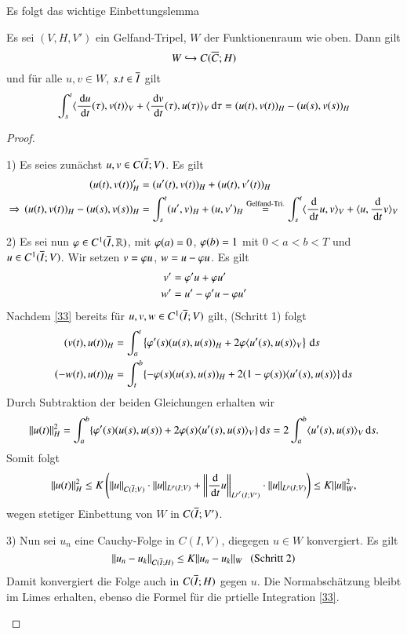 Es folgt das wichtige Einbettungslemma

\begin{lem}\label{4.38}
    Es sei $(V,H,V')$ ein Gelfand-Tripel, $W$ der Funktionenraum wie oben. Dann gilt
    \[
        W\hookrightarrow C(\overline C; H)
    \]
    und für alle $u,v\in W$, $s.t \in \overline I$ gilt
    \begin{align}\label{33}
        \int_s^t \langle  \frac{\, \mathrm{d} u}{\, \mathrm{d} t}(\tau), v(t)\rangle_V+ \langle \frac{\, \mathrm{d} v}{\, \mathrm{d} t} (\tau) , u(\tau)\rangle_V
        \, \mathrm{d}\tau =(u(t),v(t))_H - (u(s),v(s))_H
    \end{align}
\end{lem}

\begin{proof}
    \begin{description}
    \item{1)}
    Es seies zunächst $u,v \in C(\overline I; V)$. Es gilt
    \begin{align*}
        (u(t),v(t))_H'&=(u'(t),v(t))_H + (u(t),v'(t))_H\\
        \Rightarrow \, (u(t),v(t))_H-(u(s),v(s))_H &= \int_s^t (u',v)_H + (u,v')_H \overset{\text{Gelfand-Tri.}}
        {=} \int_s^t\langle \frac{\, \mathrm{d}}{\, \mathrm{d} t} u, v\rangle_V+\langle u,\frac{\, \mathrm{d}}{\, \mathrm{d} t} v \rangle _V
    \end{align*}
    \item{2)}
    Es sei nun $\varphi\in C^1(\overline I, \mathbb{R})$, mit $\varphi(a)=0$, $\varphi(b)=1$ mit $0<a<b<T$ und $u\in
    C^1(\overline I;V)$. Wir setzen $v=\varphi u$, $w=u-\varphi u$. Es gilt
    \begin{align*}
        v'&= \varphi'u + \varphi u' \\
        w'&=u'-\varphi'u-\varphi u'
    \end{align*}
    Nachdem \ref{33} bereits für $u,v,w\in C^1(\overline I; V)$ gilt, (Schritt 1) folgt
    \begin{align*}
        (v(t),u(t))_H&= \int_a^t\left\{ \varphi'(s)(u(s), u(s))_H+ 2\varphi\langle u'(s),u(s)\rangle_V\right\} \, \mathrm{d} s\\
        (-w(t),u(t))_H &= \int_t^b\{ -\varphi (s)(u(s),u(s))_H + 2 (1-\varphi(s))\langle u'(s),u(s)\rangle\} \, \mathrm{d} s
    \end{align*}
    Durch Subtraktion der beiden Gleichungen erhalten wir
    \[
        \|u(t)\|_H^2=\int_a^b \{\varphi'(s)(u(s),u(s))+ 2 \varphi(s)\langle u'(s),u(s)\rangle_V\}\, \mathrm{d} s
        =2\int_a^b\langle u'(s),u(s)\rangle _V\, \mathrm{d} s.
    \]
    Somit folgt
    \[
        \|u(t)\|_H^2\leq K\left( \|u\|_{C(\overline I; V)} \cdot \|u\|_{L^p(I;V)} + \left\| \frac{\, \mathrm{d}}{\, \mathrm{d} t}
        u\right\|_{L^{p'}(I;V')}\cdot\|u\|_{L^p(I;V)}\right)  \leq K\|u\|^2_W,
    \]
    wegen stetiger Einbettung von $W$ in $C(\overline I;V')$.
    \item{3)}
    Nun sei $u_n$ eine Cauchy-Folge in $C(I,V)$, diegegen $u\in W$ konvergiert. Es gilt
    \[
        \|u_n-u_k\|_{C(\overline I;H)} \leq K\|u_n-u_k\|_W \hspace{.25cm} \text{(Schritt 2)}
    \]
    Damit konvergiert die Folge auch in $C(\overline I; H)$ gegen $u$. Die Normabschätzung bleibt im Limes
    erhalten, ebenso die Formel für die prtielle Integration \ref{33}.
    \end{description}
    \[ \]
\end{proof}

